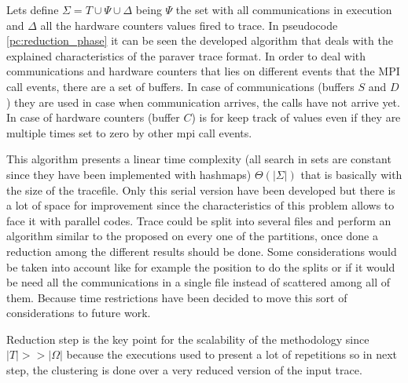 Lets define $\Sigma = T \cup \Psi \cup \Delta$ being $\Psi$ the set with
all communications in execution and $\Delta$ all the hardware counters values
fired to trace. In pseudocode \ref{pc:reduction_phase} it can be seen the
developed algorithm that deals with the explained characteristics of the paraver
trace format. In order to deal with communications and hardware counters that
lies on different events that the MPI call events, there are a set of buffers.
In case of communications (buffers $S$ and $D$) they are used in case when communication arrives, the
calls have not arrive yet. In case of hardware counters (buffer $C$) is for keep
track of values even if they are multiple times set to zero by other mpi call
events.

This algorithm presents a linear time complexity (all search in sets are
constant since they have been implemented with hashmaps) $\Theta(|\Sigma|)$ that is
basically with the size of the tracefile. Only this serial version have been
developed but there is a lot of space for improvement since the characteristics
of this problem allows to face it with parallel codes. Trace could be split into
several files and perform an algorithm similar to the proposed on every one of
the partitions, once done a reduction among the different results should be
done. Some considerations would be taken into account like for example the
position to do the splits or if it would be need all the communications in a
single file instead of scattered among all of them. Because time restrictions
have been decided to move this sort of considerations to future work.

Reduction step is the key point for 
the scalability of the methodology since $|T| >> |\Omega|$ because the executions 
used to present a lot of repetitions so in next step, the clustering is done over a very reduced version of the input trace.

